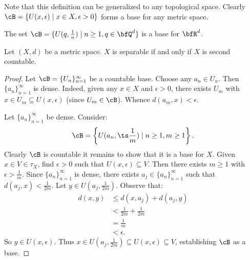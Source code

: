     Note that this definition can be generalized to any topological space. Clearly $\cB = \{U(x,\epsilon) \mid x \in X, \epsilon>0\}$ forms a base for any metric space.

    \begin{example}
        The set $\cB = \{U(q,\frac{1}{n}) \mid n \geq 1,q \in \bfQ^d\}$ is a base for $\bfR^d$.
    \end{example}

    \begin{proposition}
        Let $(X,d)$ be a metric space. $X$ is separable if and only if $X$ is second countable.
    \end{proposition}
        \begin{proof}
            Let $\cB = \{U_n\}_{n=1}^\infty$ be a countable base. Choose any $a_n \in U_n$. Then $\{a_n\}_{n = 1}^\infty$ is dense. Indeed, given any $x \in X$ and $\epsilon>0$, there exists $U_m$ with $x \in U_m \subseteq U(x,\epsilon)$ (since $U_m \in \cB$). Whence $d(a_m,x) < \epsilon$.

            Let $\{a_n\}_{n = 1}^\infty$ be dense. Consider:
                \begin{equation*}
                \begin{split}
                    \cB = \left\{U(a_n,{\ts \frac{1}{m}}) \mid n \geq 1, m \geq 1\right\}.
                \end{split}
                \end{equation*}
            Clearly $\cB$ is countable \textemdash it remains to show that it is a base for $X$. Given $x \in V \in \tau_X$, find $\epsilon > 0$ such that $U(x,\epsilon) \subseteq V$. Then there exists $m \geq 1$ with $\epsilon > \frac{1}{m}$. Since $\{a_n\}_{n = 1}^\infty$ is dense, there exists $a_j \in \{a_n\}_{n = 1}^\infty$ such that $d(a_j,x) < \frac{1}{2m}$. Let $y \in U(a_j,\frac{1}{2m})$. Observe that:
                \begin{equation*}
                \begin{split}
                    d(x,y)
                    & \leq d(x,a_j) + d(a_j,y) \\
                    & < \frac{1}{2m} + \frac{1}{2m} \\
                    & = \frac{1}{m} \\
                    & < \epsilon.
                \end{split}
                \end{equation*}
            So $y \in U(x,\epsilon)$. Thus $x \in U(a_j,\frac{1}{2m}) \subseteq U(x,\epsilon) \subseteq V$, establishing $\cB$ as a base.
        \end{proof}

